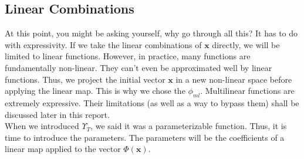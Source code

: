 \documentclass{article}
\theoremstyle{definition}
\theoremstyle{definition}
\begin{document}
\subsection{Linear Combinations}

At this point, you might be asking yourself, why go through all this? It has to do with expressivity. If we take the linear combinations of $\mathbf{x}$ directly, we will be limited to linear functions. However, in practice, many functions are fundamentally non-linear. They can't even be approximated well by linear functions. Thus, we project the initial vector $\mathbf{x}$ in a new non-linear space before applying the linear map. This is why we chose the $\phi_{ml}$. Multilinear functions are extremely expressive. Their limitations (as well as a way to bypass them) shall be discussed later in this report. \\ When we introduced $\Upsilon_{T}$, we said it was a parameterizable function. Thus, it is time to introduce the parameters. The parameters will be the coefficients of a linear map applied to the vector $\Phi(\mathbf{x})$.\\ 
\end{document}
